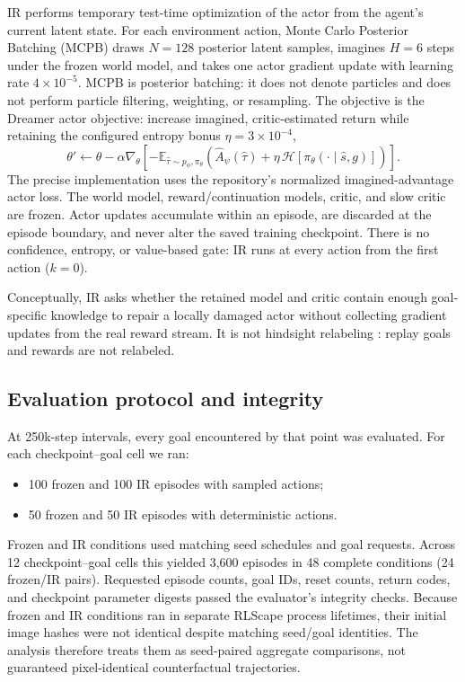 \documentclass[10pt]{article}
\begin{document}
IR performs temporary test-time optimization of the actor from the agent's current latent state. For each environment action, Monte Carlo Posterior Batching (MCPB) draws $N=128$ posterior latent samples, imagines $H=6$ steps under the frozen world model, and takes one actor gradient update with learning rate $4\times10^{-5}$. MCPB is posterior batching: it does not denote particles and does not perform particle filtering, weighting, or resampling. The objective is the Dreamer actor objective: increase imagined, critic-estimated return while retaining the configured entropy bonus $\eta=3\times10^{-4}$,
\begin{equation}
 \theta' \leftarrow \theta-\alpha\nabla_\theta
 \left[-\mathbb E_{\hat\tau\sim p_\phi,\pi_\theta}
 \left(\widehat A_\psi(\hat\tau)+\eta\,\mathcal H[\pi_\theta(\cdot\mid \hat s,g)]\right)\right].
\end{equation}
The precise implementation uses the repository's normalized imagined-advantage actor loss. The world model, reward/continuation models, critic, and slow critic are frozen. Actor updates accumulate within an episode, are discarded at the episode boundary, and never alter the saved training checkpoint. There is no confidence, entropy, or value-based gate: IR runs at every action from the first action ($k=0$).

Conceptually, IR asks whether the retained model and critic contain enough goal-specific knowledge to repair a locally damaged actor without collecting gradient updates from the real reward stream. It is not hindsight relabeling \citep{andrychowicz2017her}: replay goals and rewards are not relabeled.

\subsection{Evaluation protocol and integrity}

At 250k-step intervals, every goal encountered by that point was evaluated. For each checkpoint--goal cell we ran:
\begin{itemize}
  \item 100 frozen and 100 IR episodes with sampled actions;
  \item 50 frozen and 50 IR episodes with deterministic actions.
\end{itemize}
Frozen and IR conditions used matching seed schedules and goal requests. Across 12 checkpoint--goal cells this yielded 3,600 episodes in 48 complete conditions (24 frozen/IR pairs). Requested episode counts, goal IDs, reset counts, return codes, and checkpoint parameter digests passed the evaluator's integrity checks. Because frozen and IR conditions ran in separate RLScape process lifetimes, their initial image hashes were not identical despite matching seed/goal identities. The analysis therefore treats them as seed-paired aggregate comparisons, not guaranteed pixel-identical counterfactual trajectories.
\end{document}
